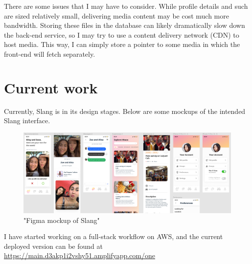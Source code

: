 \documentclass[12pt]{article}
\def\ind{\hspace*{0.3in}}
\begin{document}
\ind There are some issues that I may have to consider. While profile details and such are sized relatively small, delivering media content may be cost much more bandwidth. Storing these files in the database can likely dramatically slow down the back-end service, so I may try to use a content delivery network (CDN) to host media. This way, I can simply store a pointer to some media in which the front-end will fetch separately.

\section*{Current work}

Currently, Slang is in its design stages. Below are some mockups of the intended Slang interface.

\begin{figure}[H]
    \centering
    \caption{"Figma mockup of Slang"}
    \includegraphics[width=\textwidth]{slang-figma.png}
\end{figure}

I have started working on a full-stack workflow on AWS, and the current deployed version can be found at \url{https://main.d3akp1i2vshy51.amplifyapp.com/one}
\end{document}
